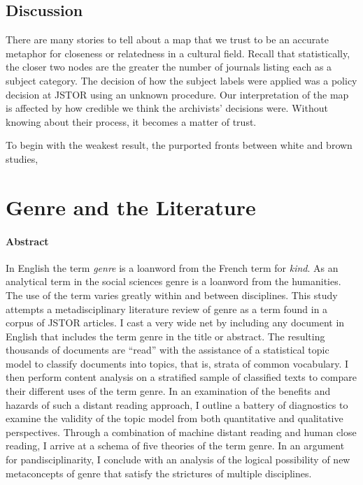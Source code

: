 \documentclass[]{book}
\theoremstyle{definition}
\theoremstyle{definition}
\theoremstyle{definition}
\theoremstyle{remark}
\begin{document}
\hypertarget{discussion}{%
\section{Discussion}\label{discussion}}

There are many stories to tell about a map that we trust to be an
accurate metaphor for closeness or relatedness in a cultural field.
Recall that statistically, the closer two nodes are the greater the
number of journals listing each as a subject category. The decision of
how the subject labels were applied was a policy decision at JSTOR using
an unknown procedure. Our interpretation of the map is affected by how
credible we think the archivists' decisions were. Without knowing about
their process, it becomes a matter of trust.

To begin with the weakest result, the purported fronts between white and
brown studies,

\hypertarget{gen}{%
\chapter{Genre and the Literature}\label{gen}}

\hypertarget{abstract-2}{%
\subsubsection*{Abstract}\label{abstract-2}}


In English the term \emph{genre} is a loanword from the
French term for \emph{kind}. As an analytical term in the social
sciences genre is a loanword from the humanities. The use of the term
varies greatly within and between disciplines. This study attempts a
metadisciplinary literature review of genre as a term found in a corpus
of JSTOR articles. I cast a very wide net by including any document in
English that includes the term genre in the title or abstract. The
resulting thousands of documents are ``read'' with the assistance of a
statistical topic model to classify documents into topics, that is,
strata of common vocabulary. I then perform content analysis on a
stratified sample of classified texts to compare their different uses of
the term genre. In an examination of the benefits and hazards of such a
distant reading approach, I outline a battery of diagnostics to examine
the validity of the topic model from both quantitative and qualitative
perspectives. Through a combination of machine distant reading and human
close reading, I arrive at a schema of five theories of the term genre.
In an argument for pandisciplinarity, I conclude with an analysis of the
logical possibility of new metaconcepts of genre that satisfy the
strictures of multiple disciplines.
\end{document}
